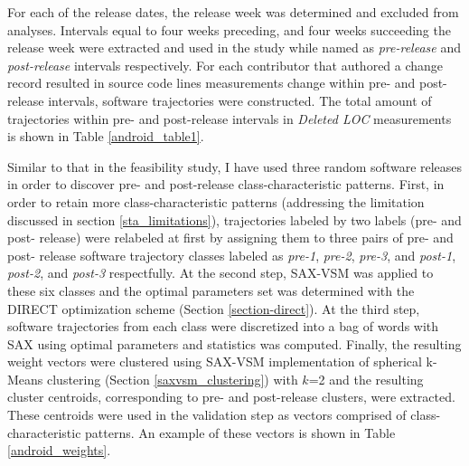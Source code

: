 For each of the release dates, the release week was determined and excluded from analyses. Intervals equal to four weeks preceding, and four weeks succeeding the release week were extracted and used in the study while named as \textit{pre-release} and \textit{post-release} intervals respectively. For each contributor that authored a change record resulted in source code lines measurements change within pre- and post- release intervals, software trajectories were constructed. The total amount of trajectories within pre- and post-release intervals in \textit{Deleted LOC} measurements is shown in Table \ref{android_table1}. 

Similar to that in the feasibility study, I have used three random software releases in order to discover pre- and post-release class-characteristic patterns. First, in order to retain more class-characteristic patterns (addressing the limitation discussed in section \ref{sta_limitations}), trajectories labeled by two labels (pre- and post- release) were relabeled at first by assigning them to three pairs of  pre- and post- release software trajectory classes labeled as \textit{pre-1}, \textit{pre-2}, \textit{pre-3}, and \textit{post-1}, \textit{post-2}, and \textit{post-3} respectfully. At the second step, SAX-VSM was applied to these six classes and the optimal parameters set was determined with the DIRECT optimization scheme (Section \ref{section-direct}). At the third step, software trajectories from each class were discretized into a bag of words with SAX using optimal parameters and \tfidf statistics was computed. Finally, the resulting weight vectors were clustered using SAX-VSM implementation of spherical k-Means clustering (Section \ref{saxvsm_clustering}) with $k$=2 and the resulting cluster centroids, corresponding to pre- and post-release clusters, were extracted. These centroids were used in the validation step as vectors comprised of class-characteristic patterns. An example of these vectors is shown in Table \ref{android_weights}.

